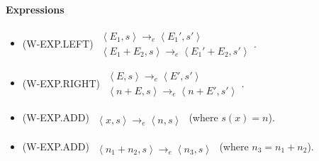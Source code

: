 \documentclass[twocolumn,english]{article}
\begin{document}
\paragraph{Expressions}
\begin{itemize}
\item {\scriptsize{}(W-EXP.LEFT)} $\begin{array}{c}
\left\langle E_{1},s\right\rangle \rightarrow_{e}\left\langle E_{1}',s'\right\rangle \\
\hline \left\langle E_{1}+E_{2},s\right\rangle \rightarrow_{e}\left\langle E_{1}'+E_{2},s'\right\rangle 
\end{array}$.
\item {\scriptsize{}(W-EXP.RIGHT)} $\begin{array}{c}
\left\langle E,s\right\rangle \rightarrow_{e}\left\langle E',s'\right\rangle \\
\hline \left\langle n+E,s\right\rangle \rightarrow_{e}\left\langle n+E',s'\right\rangle 
\end{array}$.
\item {\scriptsize{}(W-EXP.ADD)} $\begin{array}{c}
\\
\hline \left\langle x,s\right\rangle \rightarrow_{e}\left\langle n,s\right\rangle 
\end{array}$ (where $s(x)=n$).
\item {\scriptsize{}(W-EXP.ADD)} $\begin{array}{c}
\\
\hline \left\langle n_{1}+n_{2},s\right\rangle \rightarrow_{e}\left\langle n_{3},s\right\rangle 
\end{array}$ (where $n_{3}=n_{1}+n_{2}$).
\end{itemize}
\end{document}
